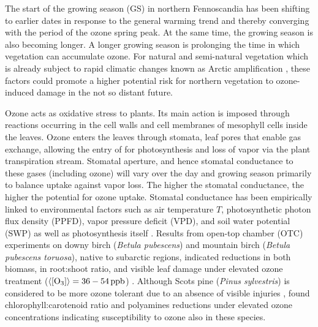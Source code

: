 \documentclass[bg, manuscript]{copernicus}
\begin{document}
The start of the growing season (GS) in northern Fennoscandia has been shifting to earlier dates in response to the general warming trend \citep[e.g.]{GCB:Menzel2006,RS:Hogda2013,IJB:Karlsen2007} and thereby converging with the period of the ozone spring peak. At the same time, the growing season is also becoming longer. A longer growing season is prolonging the time in which vegetation can accumulate ozone. For natural and semi-natural vegetation which is already subject to rapid climatic changes known as Arctic amplification \citep{AMAP2012,IPCC2013}, these factors could promote a higher potential risk for northern vegetation to ozone-induced damage in the not so distant future.

Ozone acts as oxidative stress to plants. Its main action is imposed through reactions occurring in the cell walls and cell membranes of mesophyll cells inside the leaves. Ozone enters the leaves through stomata, leaf pores that enable gas exchange, allowing the entry of  for photosynthesis and loss of  vapor via the plant transpiration stream. Stomatal aperture, and hence stomatal conductance to these gases (including ozone) will vary over the day and growing season primarily to balance  uptake against  vapor loss. The higher the stomatal conductance, the higher the potential for ozone uptake. Stomatal conductance has been empirically linked to environmental factors such as air temperature $T$, photosynthetic photon flux density (PPFD), vapor pressure deficit (VPD), and soil water potential (SWP) as well as photosynthesis itself \cite[e.g.]{PTRS:Jarvis1976, BallBerry1987, Emberson2000, ICP:MappingManual2017}. Results from open-top chamber (OTC) experiments on downy birch (\emph{Betula pubescens}) and mountain birch (\emph{Betula pubescens toruosa}), native to subarctic regions, indicated reductions in both biomass, in root:shoot ratio, and visible leaf damage under elevated ozone treatment ($\left<\chem{[O_3]}\right> = 36-54\,\unit{ppb}$) \citep{Amb:Manninen2009}. Although Scots pine (\emph{Pinus sylvestris}) is considered to be more ozone tolerant due to an absence of visible injuries \citep{Amb:Girgzdiene2009}, \citet{Amb:Manninen2009} found chlorophyll:carotenoid ratio and polyamines reductions under elevated ozone concentrations indicating susceptibility to ozone also in these species.\\
\end{document}

